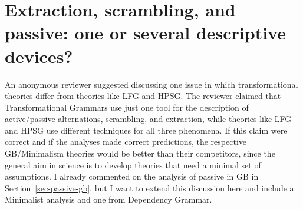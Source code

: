 \chapter{Extraction, scrambling, and passive: one or several descriptive devices?}
\label{chap-scrambling-extraction-passive}

An anonymous reviewer suggested discussing one issue in which transformational theories differ from
theories like LFG and HPSG. The reviewer claimed that Transformational Grammars use just one tool
for the description of active/passive alternations, scrambling, and extraction, while theories like
LFG and HPSG use different techniques for all three phenomena. If this claim were correct and if
the analyses made correct predictions, the respective GB/Minimalism theories would be better
than their competitors, since the general aim in science
is to develop theories that need a minimal set of assumptions. I already commented on the analysis of
passive in GB in Section~\ref{sec-passive-gb}, but I want to extend this discussion here and include
a Minimalist analysis and one from Dependency Grammar. 

